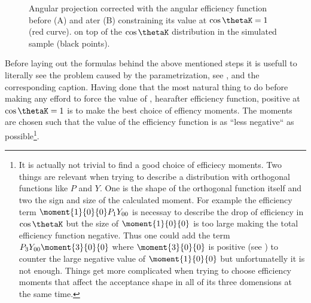 \begin{figure}[h]
  \centering
  \begin{subfigure}{0.5\textwidth}
    \scalebox{1.3}{}
    \caption{}
    \label{angAcc_nom}
  \end{subfigure}%
  \hfill%
  \begin{subfigure}{0.5\textwidth}
    \scalebox{1.3}{}
    \caption{}
    \label{angAcc_constr_fit}
  \end{subfigure}
  \caption{Angular \pdf projection corrected with the angular efficiency function before (A) and ater (B) constraining its value at $\cos\thetaK=1$ (red curve). 
           on top of the $\cos\thetaK$ distribution in the simulated sample (black points).
            }
\end{figure}

Before laying out the formulas behind the above mentioned steps it is usefull to literally see the problem caused by the parametrization, see , 
and the corresponding caption. Having done that the most natural thing to do before making any efford to force the value of , hearafter efficiency function,
positive at $\cos\thetaK=1$ is to make the best choice of effiency moments. The moments are chosen such that the value of the efficiency function is as ``less negative``
as 
possible\footnote{It is actually not trivial to find a good choice of efficiecy moments. Two things are relevant when trying to describe a 
distribution with orthogonal functions like $P$ and $Y$. One is the shape of the orthogonal function itself and two the sign and size of the calculated moment.
For example the efficiency term $\moment{1}{0}{0}P_1Y_{00}$ is necessay to describe the drop of efficiency in $\cos\thetaK$ but the size of $\moment{1}{0}{0}$ 
is too large making the total efficiency function negative. Thus one could add the term $P_3Y_{00}\moment{3}{0}{0}$ where $\moment{3}{0}{0}$ is positive
(see  ) to counter the large negative value of $\moment{1}{0}{0}$ but unfortunatelly it is not enough. Things get more complicated
when trying to choose efficiency moments that affect the acceptance shape in all of its three domensions at the same time.
}.


